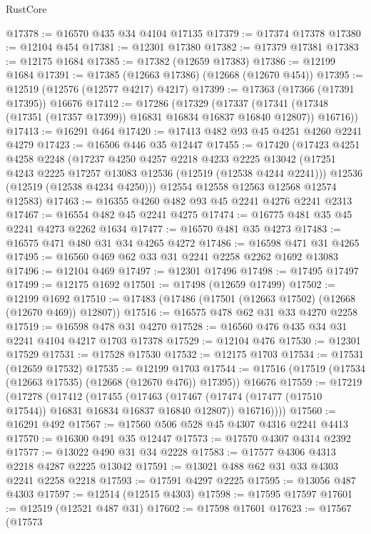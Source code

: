 \begin{lexlean}{RustCore}
\begin{coremodule}
@17378 := @16570 @435 @34 @4104 @17135
@17379 := @17374 @17378
@17380 := @12104 @454
@17381 := @12301 @17380
@17382 := @17379 @17381
@17383 := @12175 @1684
@17385 := @17382 (@12659 @17383)
@17386 := @12199 @1684
@17391 := @17385 (@12663 @17386) (@12668 (@12670 @454))
@17395 := @12519 (@12576 (@12577 @4217) @4217)
@17399 := @17363 (@17366 (@17391 @17395)) @16676
@17412 := @17286
    (@17329
      (@17337 (@17341 (@17348 (@17351 (@17357 @17399)) @16831 @16834 @16837 @16840 @12807)) @16716))
@17413 := @16291 @464
@17420 := @17413 @482 @93 @45 @4251 @4260 @2241 @4279
@17423 := @16506 @446 @35 @12447
@17455 := @17420
    (@17423
      @4251
      @4258
      @2248
      (@17237
        @4250
        @4257
        @2218
        @4233
        @2225
        @13042
        (@17251 @4243 @2225 @17257 @13083 @12536 (@12519 (@12538 @4244 @2241)))
        @12536
        (@12519 (@12538 @4234 @4250)))
      @12554
      @12558
      @12563
      @12568
      @12574
      @12583)
@17463 := @16355 @4260 @482 @93 @45 @2241 @4276 @2241 @2313
@17467 := @16554 @482 @45 @2241 @4275
@17474 := @16775 @481 @35 @45 @2241 @4273 @2262 @1634
@17477 := @16570 @481 @35 @4273
@17483 := @16575 @471 @480 @31 @34 @4265 @4272
@17486 := @16598 @471 @31 @4265
@17495 := @16560 @469 @62 @33 @31 @2241 @2258 @2262 @1692 @13083
@17496 := @12104 @469
@17497 := @12301 @17496
@17498 := @17495 @17497
@17499 := @12175 @1692
@17501 := @17498 (@12659 @17499)
@17502 := @12199 @1692
@17510 := @17483 (@17486 (@17501 (@12663 @17502) (@12668 (@12670 @469)) @12807))
@17516 := @16575 @478 @62 @31 @33 @4270 @2258
@17519 := @16598 @478 @31 @4270
@17528 := @16560 @476 @435 @34 @31 @2241 @4104 @4217 @1703 @17378
@17529 := @12104 @476
@17530 := @12301 @17529
@17531 := @17528 @17530
@17532 := @12175 @1703
@17534 := @17531 (@12659 @17532)
@17535 := @12199 @1703
@17544 := @17516 (@17519 (@17534 (@12663 @17535) (@12668 (@12670 @476)) @17395)) @16676
@17559 := @17219
    (@17278
      (@17412
        (@17455
          (@17463
            (@17467 (@17474 (@17477 (@17510 @17544)) @16831 @16834 @16837 @16840 @12807))
            @16716))))
@17560 := @16291 @492
@17567 := @17560 @506 @528 @45 @4307 @4316 @2241 @4413
@17570 := @16300 @491 @35 @12447
@17573 := @17570 @4307 @4314 @2392
@17577 := @13022 @490 @31 @34 @2228
@17583 := @17577 @4306 @4313 @2218 @4287 @2225 @13042
@17591 := @13021 @488 @62 @31 @33 @4303 @2241 @2258 @2218
@17593 := @17591 @4297 @2225
@17595 := @13056 @487 @4303
@17597 := @12514 (@12515 @4303)
@17598 := @17595 @17597
@17601 := @12519 (@12521 @487 @31)
@17602 := @17598 @17601
@17623 := @17567
    (@17573

\end{coremodule}
\end{lexlean}
